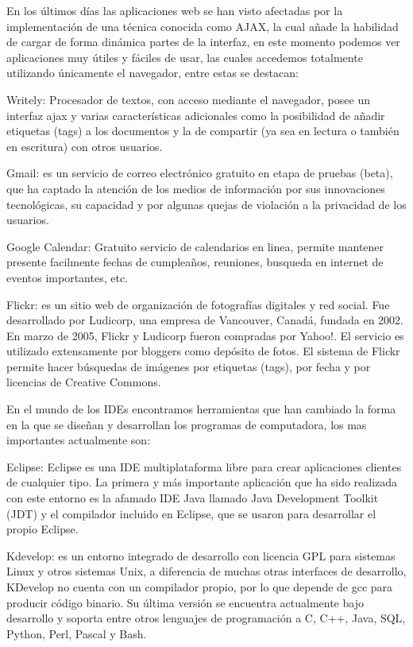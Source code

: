 En los últimos días las aplicaciones web se han visto afectadas por la implementación de una técnica conocida como AJAX, la cual añade la habilidad de cargar de forma dinámica partes de la interfaz, en este momento podemos ver aplicaciones muy útiles y fáciles de usar, las cuales accedemos totalmente utilizando únicamente el navegador, entre estas se destacan:

Writely: Procesador de textos, con acceso mediante el navegador, posee un interfaz ajax y varias características adicionales como la posibilidad de añadir etiquetas (tags) a los documentos y la de compartir (ya sea en lectura o también en escritura) con otros usuarios.

Gmail: es un servicio de correo electrónico gratuito en etapa de pruebas (beta), que ha captado la atención de los medios de información por sus innovaciones tecnológicas, su capacidad y por algunas quejas de violación a la privacidad de los usuarios.

Google Calendar: Gratuito servicio de calendarios en linea, permite mantener presente facilmente fechas de cumpleaños, reuniones, busqueda en internet de eventos importantes, etc.

Flickr: es un sitio web de organización de fotografías digitales y red social. Fue desarrollado por Ludicorp, una empresa de Vancouver, Canadá, fundada en 2002. En marzo de 2005, Flickr y Ludicorp fueron compradas por Yahoo!. El servicio es utilizado extensamente por bloggers como depósito de fotos. El sistema de Flickr permite hacer búsquedas de imágenes por etiquetas (tags), por fecha y por licencias de Creative Commons.

En el mundo de los IDEs encontramos herramientas que han cambiado la forma en la que se diseñan y desarrollan los programas de computadora, los mas importantes actualmente son:

Eclipse: Eclipse es una IDE multiplataforma libre para crear aplicaciones clientes de cualquier tipo. La primera y más importante aplicación que ha sido realizada con este entorno es la afamado IDE Java llamado Java Development Toolkit (JDT) y el compilador incluido en Eclipse, que se usaron para desarrollar el propio Eclipse.

Kdevelop: es un entorno integrado de desarrollo con licencia GPL para sistemas Linux y otros sistemas Unix, a diferencia de muchas otras interfaces de desarrollo, KDevelop no cuenta con un compilador propio, por lo que depende de gcc para producir código binario. Su última versión se encuentra actualmente bajo desarrollo y soporta entre otros lenguajes de programación a C, C++, Java, SQL, Python, Perl, Pascal y Bash.


